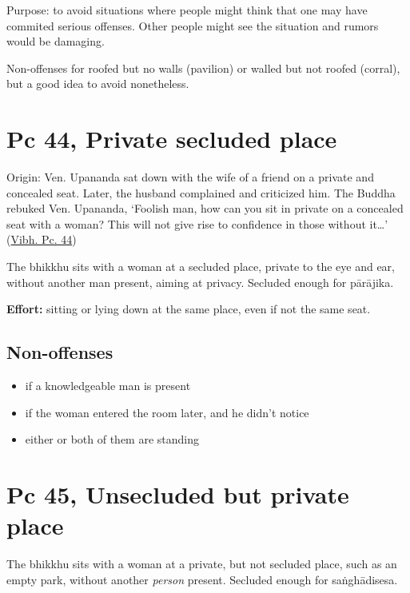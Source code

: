 Purpose: to avoid situations where people might think that one may have
commited serious offenses. Other people might see the situation and
rumors would be damaging.

Non-offenses for roofed but no walls (pavilion) or walled but not roofed
(corral), but a good idea to avoid nonetheless.

\section{Pc 44, Private secluded place}

Origin: Ven. Upananda sat down with the wife of a friend on a private
and concealed seat. Later, the husband complained and criticized him.
The Buddha rebuked Ven. Upananda, `Foolish man, how can you sit in
private on a concealed seat with a woman? This will not give rise to
confidence in those without it\ldots{}'
(\href{https://suttacentral.net/pli-tv-bu-vb-pc44/en/brahmali}{Vibh. Pc.
44})

The bhikkhu sits with a woman at a secluded place, private to the eye
and ear, without another man present, aiming at privacy. Secluded enough
for pārājika.

\textbf{Effort:} sitting or lying down at the same place, even if not
the same seat.

\subsection{Non-offenses}

\vspace*{-0.5\baselineskip}
\enlargethispage{\baselineskip}

\begin{itemize}
\tightlist
\item
  if a knowledgeable man is present
\item
  if the woman entered the room later, and he didn't notice
\item
  either or both of them are standing
\end{itemize}

\section{Pc 45, Unsecluded but private place}

The bhikkhu sits with a woman at a private, but not secluded place, such
as an empty park, without another \emph{person} present. Secluded enough
for saṅghādisesa.

